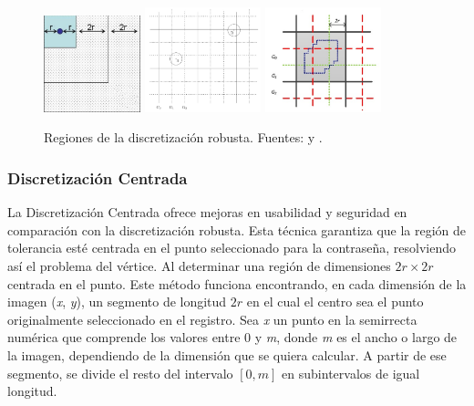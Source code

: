 		\begin{figure}[H]
			\centering
			\includegraphics[width=0.25\textwidth]{image4.jpg}
			\includegraphics[width=0.3\textwidth]{image2.png}
			\includegraphics[width=0.3\textwidth]{image3.png}
			\caption{Regiones de la discretizaci\'on robusta. Fuentes: \cite{zhu2013security} y \cite{chiasson2008centered}.}
		\end{figure}
	
\subsubsection{Discretización Centrada}
	
La Discretización Centrada \cite{chiasson2008centered} ofrece mejoras en usabilidad y seguridad en comparación con la discretización robusta. Esta técnica garantiza que la región de tolerancia esté centrada en el punto seleccionado para la contraseña, resolviendo así el problema del vértice. Al determinar una región de dimensiones \(2r \times 2r\) centrada en el punto. Este método funciona encontrando, en cada dimensión de la imagen (\textit{x}, \textit{y}), un segmento de longitud \(2r\) en el cual el centro sea el punto originalmente seleccionado en el registro. Sea \textit{x} un punto en la semirrecta numérica que comprende los valores entre 0 y \textit{m}, donde \textit{m} es el ancho o largo de la imagen, dependiendo de la dimensión que se quiera calcular. A partir de ese segmento, se divide el resto del intervalo $[0, m]$ en subintervalos de igual longitud.

